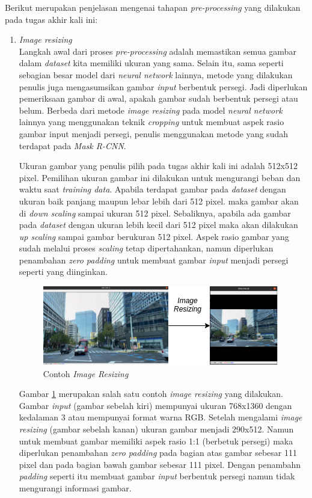 Berikut merupakan penjelasan mengenai tahapan \textit{pre-processing} yang dilakukan pada tugas akhir kali ini:
\begin{enumerate}
	\item \textit{Image resizing}\\
		Langkah awal dari proses \textit{pre-processing} adalah memastikan semua gambar dalam \textit{dataset} kita memiliki ukuran yang sama. Selain itu, sama seperti sebagian besar model dari \textit{neural network} lainnya, metode yang dilakukan penulis juga mengasumsikan gambar \textit{input} berbentuk persegi. Jadi diperlukan pemeriksaan gambar di awal, apakah gambar sudah berbentuk persegi atau belum. Berbeda dari metode \textit{image resizing} pada model \textit{neural network} lainnya yang menggunakan teknik \textit{cropping} untuk membuat aspek rasio gambar input menjadi persegi, penulis menggunakan metode yang sudah terdapat pada \textit{Mask R-CNN}.
		
		Ukuran gambar yang penulis pilih pada tugas akhir kali ini adalah 512x512 pixel. Pemilihan ukuran gambar ini dilakukan untuk mengurangi beban dan waktu saat \textit{training data}. Apabila terdapat gambar pada \textit{dataset} dengan ukuran baik panjang maupun lebar lebih dari 512 pixel. maka gambar akan di \textit{down scaling} sampai ukuran 512 pixel. Sebaliknya, apabila ada gambar pada \textit{dataset} dengan ukuran lebih kecil dari 512 pixel maka akan dilakukan \textit{up scaling} sampai gambar berukuran 512 pixel. Aspek rasio gambar yang sudah melalui proses \textit{scaling} tetap dipertahankan, namun diperlukan penambahan \textit{zero padding} untuk membuat gambar \textit{input} menjadi persegi seperti yang diinginkan.
		
		\begin{figure}[ht]
			\centering
			\includegraphics[scale=0.7]{gambar/image-resizing.png}
			\caption{Contoh \textit{Image Resizing}}
			\label{fig:image-resizing}
		\end{figure}
		
		Gambar \ref{fig:image-resizing} merupakan salah satu contoh \textit{image resizing} yang dilakukan. Gambar \textit{input} (gambar sebelah kiri) mempunyai ukuran 768x1360 dengan kedalaman 3 atau mempunyai format warna RGB. Setelah mengalami \textit{image resizing} (gambar sebelah kanan) ukuran gambar menjadi 290x512. Namun untuk membuat gambar memiliki aspek rasio 1:1 (berbetuk persegi) maka diperlukan penambahan \textit{zero padding} pada bagian atas gambar sebesar 111 pixel dan pada bagian bawah gambar sebesar 111 pixel. Dengan penambahn \textit{padding} seperti itu membuat gambar \textit{input} berbentuk persegi namun tidak mengurangi informasi gambar. 
		   

\end{enumerate}

